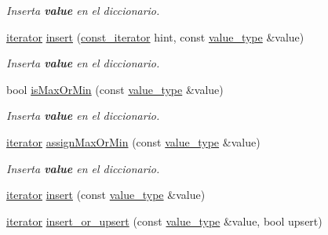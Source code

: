 \begin{Indent}
\begin{DoxyCompactItemize}
\begin{DoxyCompactList}\small\item\em Inserta {\bfseries value} en el diccionario. \end{DoxyCompactList}\item 
\hyperlink{classaed2_1_1map_1_1iterator}{iterator} \hyperlink{classaed2_1_1map_a6941cde9a79c27f054b5c97a587a1854_a6941cde9a79c27f054b5c97a587a1854}{insert} (\hyperlink{classaed2_1_1map_1_1const__iterator}{const\+\_\+iterator} hint, const \hyperlink{classaed2_1_1map_a719db98e0ff9a837610f76be33264680_a719db98e0ff9a837610f76be33264680}{value\+\_\+type} \&value)
\begin{DoxyCompactList}\small\item\em Inserta {\bfseries value} en el diccionario. \end{DoxyCompactList}\item 
bool \hyperlink{classaed2_1_1map_a81db4ead6daafe94938d5410173bdb6c_a81db4ead6daafe94938d5410173bdb6c}{is\+Max\+Or\+Min} (const \hyperlink{classaed2_1_1map_a719db98e0ff9a837610f76be33264680_a719db98e0ff9a837610f76be33264680}{value\+\_\+type} \&value)
\begin{DoxyCompactList}\small\item\em Inserta {\bfseries value} en el diccionario. \end{DoxyCompactList}\item 
\hyperlink{classaed2_1_1map_1_1iterator}{iterator} \hyperlink{classaed2_1_1map_a50aae07014200a53b95394f349f55948_a50aae07014200a53b95394f349f55948}{assign\+Max\+Or\+Min} (const \hyperlink{classaed2_1_1map_a719db98e0ff9a837610f76be33264680_a719db98e0ff9a837610f76be33264680}{value\+\_\+type} \&value)
\begin{DoxyCompactList}\small\item\em Inserta {\bfseries value} en el diccionario. \end{DoxyCompactList}\item 
\hyperlink{classaed2_1_1map_1_1iterator}{iterator} \hyperlink{classaed2_1_1map_a60aacba06b1579630b3c8e996cf248c8_a60aacba06b1579630b3c8e996cf248c8}{insert} (const \hyperlink{classaed2_1_1map_a719db98e0ff9a837610f76be33264680_a719db98e0ff9a837610f76be33264680}{value\+\_\+type} \&value)
\item 
\hyperlink{classaed2_1_1map_1_1iterator}{iterator} \hyperlink{classaed2_1_1map_aef47582a93a069c4ec95da8c595e4fee_aef47582a93a069c4ec95da8c595e4fee}{insert\+\_\+or\+\_\+upsert} (const \hyperlink{classaed2_1_1map_a719db98e0ff9a837610f76be33264680_a719db98e0ff9a837610f76be33264680}{value\+\_\+type} \&value, bool upsert)

\end{DoxyCompactItemize}
\end{Indent}
